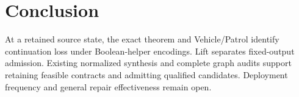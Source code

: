 \section{Conclusion}\label{sec:conclusion}
At a retained source state, the exact theorem and Vehicle/Patrol identify
continuation loss under Boolean-helper encodings. Lift separates fixed-output
admission. Existing normalized synthesis and complete graph audits support
retaining feasible contracts and admitting qualified candidates. Deployment
frequency and general repair effectiveness remain open.

